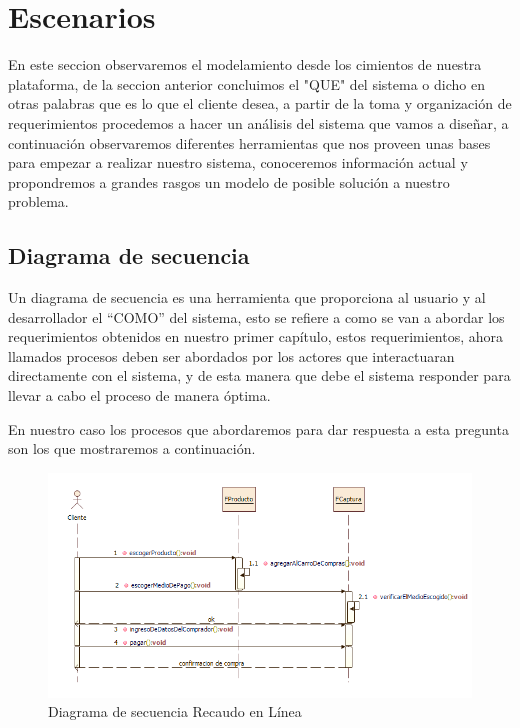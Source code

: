 \newpage


\section{Escenarios}
En este seccion observaremos el modelamiento desde los cimientos de nuestra plataforma, de la seccion anterior concluimos el "QUE" del sistema o dicho en otras palabras que es lo que el cliente desea, a partir de la toma y organización de requerimientos procedemos a hacer un análisis del sistema que vamos a diseñar, a continuación observaremos diferentes herramientas que nos proveen unas bases para empezar a realizar nuestro sistema, conoceremos información actual y propondremos a grandes rasgos un modelo de posible solución a nuestro problema. 


\subsection{Diagrama de secuencia}

Un diagrama de secuencia es una herramienta que proporciona al usuario y al desarrollador el “COMO” del sistema, esto se refiere a como se van a abordar los requerimientos obtenidos en nuestro primer capítulo, estos requerimientos, ahora llamados procesos deben ser abordados por los actores que interactuaran directamente con el sistema, y de esta manera  que debe el sistema responder para llevar a cabo el proceso de manera óptima.

En nuestro caso los procesos que abordaremos para dar respuesta a esta pregunta son los que mostraremos a continuación.

\begin{figure}[th!]
	\centering
	\includegraphics[width=1.0\linewidth]{arquitectura/imagenes/DiagramaDeSequenciaRE}
	\caption{Diagrama de secuencia Recaudo en Línea}
\end{figure}

